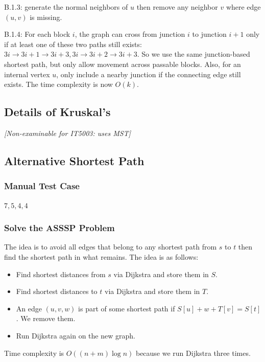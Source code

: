 \documentclass[12pt]{article}
\begin{document}
B.1.3: generate the normal neighbors of $u$ then remove any neighbor $v$ where edge $(u,v)$ is missing.

B.1.4: For each block $i$, the graph can cross from junction $i$ to junction $i+1$ only if at least one of these two paths still exists: $3i\to 3i+1\to 3i+3, 3i\to 3i+2\to 3i+3$. So we use the same junction-based shortest path, but only allow movement across passable blocks. Also, for an internal vertex $u$, only include a nearby junction if the connecting edge still exists. The time complexity is now $O(k)$.
\subsection{Details of Kruskal's}
\textit{[Non-examinable for IT5003: uses MST]}
\subsection{Alternative Shortest Path}
\subsubsection{Manual Test Case}
$7, 5, 4, 4$
\subsubsection{Solve the ASSSP Problem}
The idea is to avoid all edges that belong to any shortest path from $s$ to $t$ then find the shortest path in what remains. The idea is as follows:
\begin{itemize}
    \item Find shortest distances from $s$ via Dijkstra and store them in $S$.
    \item Find shortest distances to $t$ via Dijkstra and store them in $T$.
    \item An edge $(u, v, w)$ is part of some shortest path if $S[u]+w+T[v]=S[t]$. We remove them.
    \item Run Dijkstra again on the new graph.
\end{itemize}
Time complexity is $O((n + m)\log n)$ because we run Dijkstra three times.
\newpage
\end{document}
